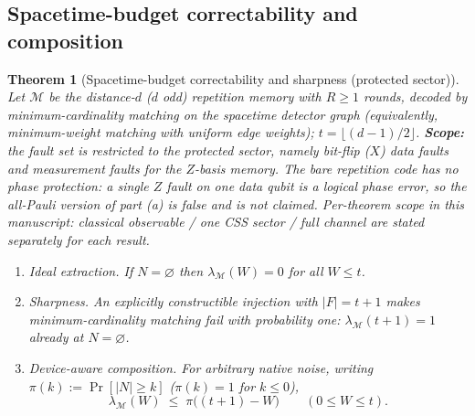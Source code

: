 \documentclass[pdflatex,sn-mathphys-num]{sn-jnl}
\theoremstyle{thmstyleone}
\newtheorem{theorem}{Theorem}
\theoremstyle{thmstyletwo}
\theoremstyle{thmstylethree}
\begin{document}
\subsection{Spacetime-budget correctability and composition}

\begin{theorem}[Spacetime-budget correctability and sharpness (protected sector)]\label{thm:spacetime}
Let $\mathcal{M}$ be the distance-$d$ ($d$ odd) repetition memory with $R\ge1$ rounds, decoded by \emph{minimum-cardinality} matching on the spacetime detector graph (equivalently, minimum-weight matching with uniform edge weights); $t=\lfloor(d-1)/2\rfloor$. \textbf{Scope:} the fault set is restricted to the \emph{protected sector}, namely bit-flip ($X$) data faults and measurement faults for the $Z$-basis memory. The bare repetition code has no phase protection: a single $Z$ fault on one data qubit is a logical phase error, so the all-Pauli version of part (a) is false and is not claimed. Per-theorem scope in this manuscript: classical observable / one CSS sector / full channel are stated separately for each result.
\begin{enumerate}[label=(\alph*),leftmargin=1.6em]
\item \emph{Ideal extraction.} If $N=\varnothing$ then $\lambda_{\mathcal{M}}(W)=0$ for all $W\le t$.
\item \emph{Sharpness.} An explicitly constructible injection with $|F|=t+1$ makes minimum-cardinality matching fail with probability one: $\lambda_{\mathcal{M}}(t+1)=1$ already at $N=\varnothing$.
\item \emph{Device-aware composition.} For arbitrary native noise, writing $\pi(k):=\Pr[|N|\ge k]$ ($\pi(k)=1$ for $k\le0$),
\[
\lambda_{\mathcal{M}}(W)\;\le\;\pi\bigl((t{+}1)-W\bigr)\qquad(0\le W\le t).
\]
\end{enumerate}
\end{theorem}
\end{document}
